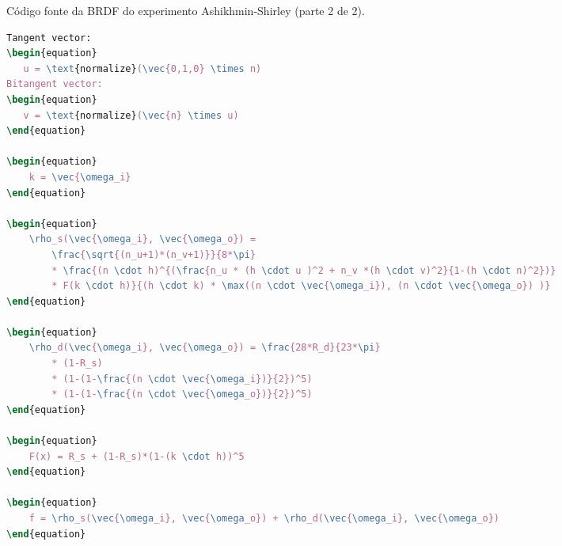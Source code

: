 \begin{codigo}[H]
    \caption{\small Código fonte da BRDF do experimento Ashikhmin-Shirley (parte 2 de 2).}
    \label{cod-ashikhmin-shirley-close-to-original-eqlang-pt-2}
\begin{lstlisting}[language=tex, frame=none, inputencoding=utf8]
Tangent vector:
\begin{equation}
   u = \text{normalize}(\vec{0,1,0} \times n)
Bitangent vector:
\begin{equation}
   v = \text{normalize}(\vec{n} \times u)
\end{equation}

\begin{equation}
    k = \vec{\omega_i}
\end{equation}

\begin{equation}
    \rho_s(\vec{\omega_i}, \vec{\omega_o}) =
        \frac{\sqrt{(n_u+1)*(n_v+1)}}{8*\pi}
        * \frac{(n \cdot h)^{(\frac{n_u * (h \cdot u )^2 + n_v *(h \cdot v)^2}{1-(h \cdot n)^2})}
        * F(k \cdot h)}{(h \cdot k) * \max((n \cdot \vec{\omega_i}), (n \cdot \vec{\omega_o}) )}
\end{equation}

\begin{equation}
    \rho_d(\vec{\omega_i}, \vec{\omega_o}) = \frac{28*R_d}{23*\pi}
        * (1-R_s)
        * (1-(1-\frac{(n \cdot \vec{\omega_i})}{2})^5)
        * (1-(1-\frac{(n \cdot \vec{\omega_o})}{2})^5)
\end{equation}

\begin{equation}
    F(x) = R_s + (1-R_s)*(1-(k \cdot h))^5
\end{equation}

\begin{equation}
    f = \rho_s(\vec{\omega_i}, \vec{\omega_o}) + \rho_d(\vec{\omega_i}, \vec{\omega_o})
\end{equation}
\end{lstlisting}
\end{codigo}
